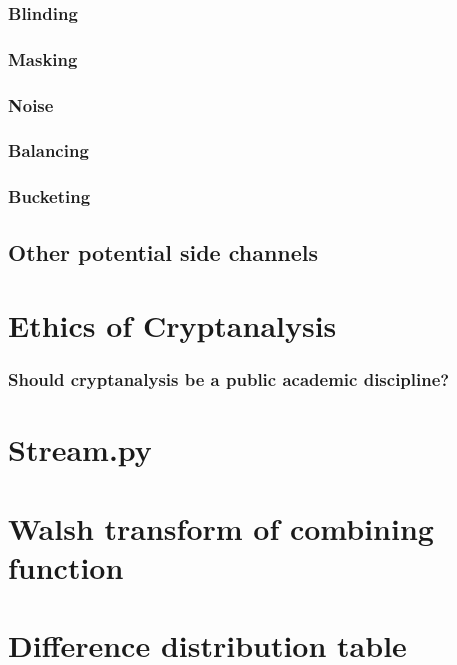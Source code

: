 \documentclass[british,11pt,a4paper]{article}
\begin{document}
\subsubsection{Blinding}
\subsubsection{Masking}
\subsubsection{Noise}
\subsubsection{Balancing}
\subsubsection{Bucketing}
\subsection{Other potential side channels}

\clearpage
\section{Ethics of Cryptanalysis}
\subsubsection{Should cryptanalysis be a public academic discipline?}

\clearpage
\begin{appendices}
  \section{Stream.py}\label{app:stream}
  

  \section{Walsh transform of combining function}\label{app:walsh}
  

  \section{Difference distribution table}\label{app:diff_distrib_tab}
  


\end{appendices}
\clearpage


\end{document}
